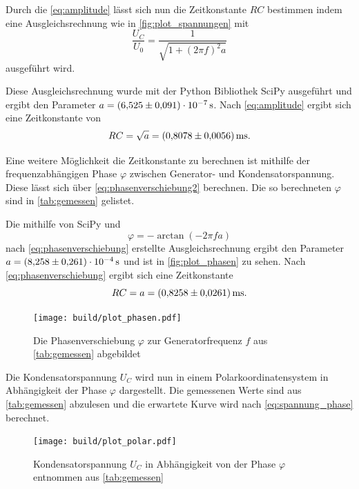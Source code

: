 \FloatBarrier

Durch die \autoref{eq:amplitude} lässt sich nun die Zeitkonstante $RC$ bestimmen indem eine Ausgleichsrechnung wie in \autoref{fig:plot_spannungen} mit
\begin{equation}
    \frac{U_C}{U_0} = \frac{1}{\sqrt{1+(2 \pi f)^2a}}
\end{equation} 
ausgeführt wird.

Diese Ausgleichsrechnung wurde mit der Python Bibliothek SciPy\cite{scipy} ausgeführt und ergibt den Parameter $a = \SI{6.525+-0.091e-7}{\second}$. Nach \autoref{eq:amplitude} ergibt sich eine Zeitkonstante von
\begin{equation}
    RC = \sqrt{a} = \SI{0.8078+-0.0056}{\milli\second}.
\end{equation}

\FloatBarrier

Eine weitere Möglichkeit die Zeitkonstante zu berechnen ist mithilfe der frequenzabhängigen Phase $\varphi$ zwischen Generator- und Kondensatorspannung. Diese lässt sich über \autoref{eq:phasenverschiebung2} berechnen. Die so berechneten $\varphi$ sind in \autoref{tab:gemessen} gelistet.

Die mithilfe von SciPy\cite{scipy} und
\begin{equation}
    \varphi=-\arctan(-2\pi f a)
\end{equation}
nach \autoref{eq:phasenverschiebung} erstellte Ausgleichsrechnung ergibt den Parameter $a=\SI{8.258+-0.261e-4}{\second}$ und ist in \autoref{fig:plot_phasen} zu sehen. Nach \autoref{eq:phasenverschiebung} ergibt sich eine Zeitkonstante
\begin{equation}
    RC = a = \SI{0.8258+-0.0261}{\milli\second}.
\end{equation}

\begin{figure}
    \centering
    \texttt{[image: build/plot\_phasen.pdf]}
    \caption{Die Phasenverschiebung $\varphi$ zur Generatorfrequenz $f$ aus \autoref{tab:gemessen} abgebildet}
    \label{fig:plot_phasen}
\end{figure}
Die Kondensatorspannung $U_C$ wird nun in einem Polarkoordinatensystem in Abhängigkeit der Phase $\varphi$ dargestellt. Die gemessenen Werte sind aus \autoref{tab:gemessen} abzulesen und die erwartete Kurve wird nach \autoref{eq:spannung_phase} berechnet.
\begin{figure}
    \centering
    \texttt{[image: build/plot\_polar.pdf]}
    \caption{Kondensatorspannung $U_C$ in Abhängigkeit von der Phase $\varphi$ entnommen aus \autoref{tab:gemessen}}
    \label{fig:plot_polar}
\end{figure}

